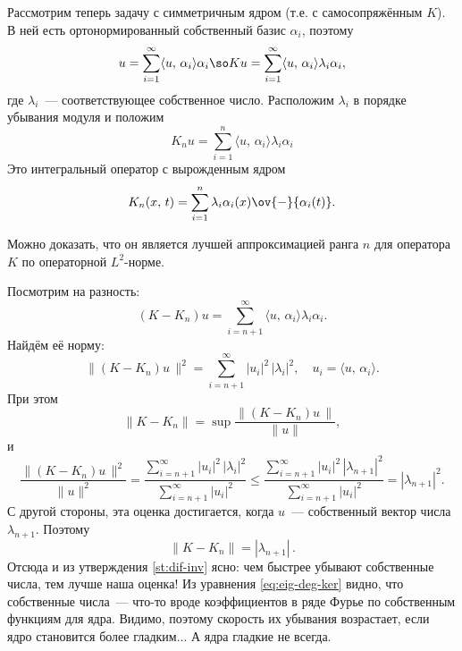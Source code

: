 \documentclass{trlnotes}
\begin{document}
    \begin{rem}
        Рассмотрим теперь задачу с симметричным ядром (т.е. с самосопряжённым $K$). В ней есть ортонормированный собственный базис $\alpha_i$, поэтому
        \[
            u = \sum\limits_{i = 1}^{\infty} \langle u, \, \alpha_i \rangle \alpha_i \so Ku = \sum\limits_{i = 1}^{\infty} \langle u, \, \alpha_i \rangle \lambda_i \alpha_i,
        \]
        где $\lambda_i$~--- соответствующее собственное число. Расположим $\lambda_i$ в порядке убывания модуля и положим
        \[
            K_n u = \sum\limits_{i = 1}^{n} \langle u, \, \alpha_i \rangle \lambda_i \alpha_i
        \]
        Это интегральный оператор с вырожденным ядром
        \begin{equation}\label{eq:eig-deg-ker}
            K_n(x, \, t) = \sum\limits_{i = 1}^n \lambda_i \alpha_i(x) \ov{-}{\alpha_i(t)}.
        \end{equation}

        Можно доказать, что он является лучшей аппроксимацией ранга $n$ для оператора $K$ по операторной $L^2$-норме.

        Посмотрим на разность:
        \[
            (K - K_n)u = \sum\limits_{i = n+1}^{\infty} \langle u, \, \alpha_i \rangle \lambda_i \alpha_i.
        \]
        Найдём её норму:
        \[
            \big\|(K - K_n)u \,\big\|^2 = \sum\limits_{i = n + 1}^{\infty} |u_i|^2 \, |\lambda_i|^2, \quad u_i = \langle u, \, \alpha_i \rangle.
        \]
        При этом
        \[
            \|K - K_n\| = \sup \dfrac{\big\|(K - K_n)u \,\big\|}{\|u\|},
        \]
        и
        \[
            \dfrac{\big\|(K - K_n)u \,\big\|^2}{\|u\|^2} = \dfrac{\sum\limits_{i = n + 1}^{\infty} |u_i|^2 \, |\lambda_i|^2}{\sum\limits_{i = n + 1}^{\infty} |u_i|^2} \leqslant \dfrac{\sum\limits_{i = n + 1}^{\infty} |u_i|^2 \, |\lambda_{n + 1}|^2}{\sum\limits_{i = n + 1}^{\infty} |u_i|^2} = |\lambda_{n+1}|^2.
        \]
        С другой стороны, эта оценка достигается, когда $u$~--- собственный вектор числа $\lambda_{n+1}$. Поэтому
        \[
            \boxed{\|K - K_n\| = |\lambda_{n + 1}|} \, .
        \]
        Отсюда и из утверждения \ref{st:dif-inv} ясно: чем быстрее убывают собственные числа, тем лучше наша оценка! 
        Из уравнения \ref{eq:eig-deg-ker} видно, что собственные числа~--- что-то вроде коэффициентов в ряде Фурье по собственным функциям для ядра. Видимо, поэтому скорость их убывания возрастает, если ядро становится более гладким... А ядра гладкие не всегда.
    \end{rem}
\end{document}
